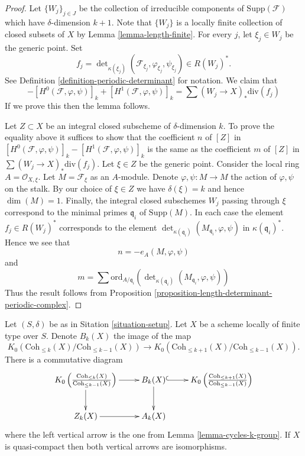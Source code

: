 \begin{proof}
Let $\{W_j\}_{j \in J}$ be the collection of irreducible
components of $\text{Supp}(\mathcal{F})$
which have $\delta$-dimension $k + 1$. Note that $\{W_j\}$
is a locally finite collection of closed subsets of
$X$ by Lemma \ref{lemma-length-finite}.
For every $j$, let $\xi_j \in W_j$ be the generic point.
Set
$$
f_j = \det\nolimits_{\kappa(\xi_j)}
(\mathcal{F}_{\xi_j}, \varphi_{\xi_j}, \psi_{\xi_j})
\in
R(W_j)^*.
$$
See Definition \ref{definition-periodic-determinant} for notation.
We claim that
$$
- [H^0(\mathcal{F}, \varphi, \psi)]_k + [H^1(\mathcal{F}, \varphi, \psi)]_k
=
\sum (W_j \to X)_*\text{div}(f_j)
$$
If we prove this then the lemma follows.

\medskip\noindent
Let $Z \subset X$ be an integral closed subscheme of $\delta$-dimension $k$.
To prove the equality above it suffices to show that the coefficient $n$
of $[Z]$ in
$
[H^0(\mathcal{F}, \varphi, \psi)]_k - [H^1(\mathcal{F}, \varphi, \psi)]_k
$
is the same as the coefficient $m$ of $[Z]$ in
$
\sum (W_j \to X)_*\text{div}(f_j)
$.
Let $\xi \in Z$ be the generic point.
Consider the local ring $A = \mathcal{O}_{X, \xi}$.
Let $M = \mathcal{F}_\xi$ as an $A$-module.
Denote $\varphi, \psi : M \to M$ the action of $\varphi, \psi$ on
the stalk.
By our choice of $\xi \in Z$ we have $\delta(\xi) = k$
and hence $\dim(M) = 1$.
Finally, the integral closed subschemes
$W_j$ passing through $\xi$ correspond to the minimal primes
$\mathfrak q_i$ of $\text{Supp}(M)$.
In each case the element $f_j \in R(W_j)^*$ corresponds to
the element $\det_{\kappa(\mathfrak q_i)}(M_{\mathfrak q_i}, \varphi, \psi)$
in $\kappa(\mathfrak q_i)^*$. Hence we see that
$$
n = - e_A(M, \varphi, \psi)
$$
and
$$
m =
\sum
\text{ord}_{A/\mathfrak q_i}
(\det\nolimits_{\kappa(\mathfrak q_i)}(M_{\mathfrak q_i}, \varphi, \psi))
$$
Thus the result follows from
Proposition \ref{proposition-length-determinant-periodic-complex}.
\end{proof}

\begin{lemma}
\label{lemma-cycles-rational-equivalence-K-group}
Let $(S, \delta)$ be as in Sitation \ref{situation-setup}.
Let $X$ be a scheme locally of finite type over $S$.
Denote $B_k(X)$ the image of the map
$$
K_0(\text{Coh}_{\leq k}(X)/\text{Coh}_{\leq k - 1}(X))
\longrightarrow
K_0(\text{Coh}_{\leq k + 1}(X)/\text{Coh}_{\leq k - 1}(X)).
$$
There is a commutative diagram
$$
\xymatrix{
K_0\left(\frac{\text{Coh}_{\leq k}(X)}{\text{Coh}_{\leq k - 1}(X)}\right)
\ar[r] \ar[d] &
B_k(X) \ar[d] \ar@{^{(}->}[r] &
K_0\left(\frac{\text{Coh}_{\leq k + 1}(X)}{\text{Coh}_{\leq k - 1}(X)}\right)
\\
Z_k(X) \ar[r] & A_k(X)
}
$$
where the left vertical arrow is the one from
Lemma \ref{lemma-cycles-k-group}. If $X$ is quasi-compact
then both vertical arrows are isomorphisms.
\end{lemma}

